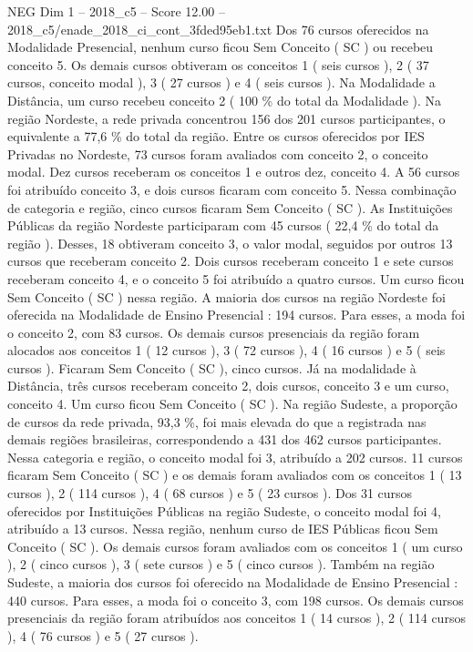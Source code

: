 \begin{textsample}{NEG Dim 1 – 2018\_c5 – Score 12.00 – 2018\_c5/enade\_2018\_ci\_cont\_3fded95eb1.txt}
Dos 76 cursos oferecidos na Modalidade Presencial, nenhum curso ficou Sem Conceito ( SC ) ou recebeu conceito 5.
Os demais cursos obtiveram os conceitos 1 ( seis cursos ), 2 ( 37 cursos, conceito modal ), 3 ( 27 cursos ) e 4 ( seis cursos ).
Na Modalidade a Distância, um curso recebeu conceito 2 ( 100 \% do total da Modalidade ).
Na região Nordeste, a rede privada concentrou 156 dos 201 cursos participantes, o equivalente a 77,6 \% do total da região.
Entre os cursos oferecidos por IES Privadas no Nordeste, 73 cursos foram avaliados com conceito 2, o conceito modal.
Dez cursos receberam os conceitos 1 e outros dez, conceito 4.
A 56 cursos foi atribuído conceito 3, e dois cursos ficaram com conceito 5.
Nessa combinação de categoria e região, cinco cursos ficaram Sem Conceito ( SC ).
As Instituições Públicas da região Nordeste participaram com 45 cursos ( 22,4 \% do total da região ).
Desses, 18 obtiveram conceito 3, o valor modal, seguidos por outros 13 cursos que receberam conceito 2.
Dois cursos receberam conceito 1 e sete cursos receberam conceito 4, e o conceito 5 foi atribuído a quatro cursos.
Um curso ficou Sem Conceito ( SC ) nessa região.
A maioria dos cursos na região Nordeste foi oferecida na Modalidade de Ensino Presencial : 194 cursos.
Para esses, a moda foi o conceito 2, com 83 cursos.
Os demais cursos presenciais da região foram alocados aos conceitos 1 ( 12 cursos ), 3 ( 72 cursos ), 4 ( 16 cursos ) e 5 ( seis cursos ).
Ficaram Sem Conceito ( SC ), cinco cursos.
Já na modalidade à Distância, três cursos receberam conceito 2, dois cursos, conceito 3 e um curso, conceito 4.
Um curso ficou Sem Conceito ( SC ).
Na região Sudeste, a proporção de cursos da rede privada, 93,3 \%, foi mais elevada do que a registrada nas demais regiões brasileiras, correspondendo a 431 dos 462 cursos participantes.
Nessa categoria e região, o conceito modal foi 3, atribuído a 202 cursos. 11 cursos ficaram Sem Conceito ( SC ) e os demais foram avaliados com os conceitos 1 ( 13 cursos ), 2 ( 114 cursos ), 4 ( 68 cursos ) e 5 ( 23 cursos ).
Dos 31 cursos oferecidos por Instituições Públicas na região Sudeste, o conceito modal foi 4, atribuído a 13 cursos.
Nessa região, nenhum curso de IES Públicas ficou Sem Conceito ( SC ).
Os demais cursos foram avaliados com os conceitos 1 ( um curso ), 2 ( cinco cursos ), 3 ( sete cursos ) e 5 ( cinco cursos ).
Também na região Sudeste, a maioria dos cursos foi oferecido na Modalidade de Ensino Presencial : 440 cursos.
Para esses, a moda foi o conceito 3, com 198 cursos.
Os demais cursos presenciais da região foram atribuídos aos conceitos 1 ( 14 cursos ), 2 ( 114 cursos ), 4 ( 76 cursos ) e 5 ( 27 cursos ).

\end{textsample}
